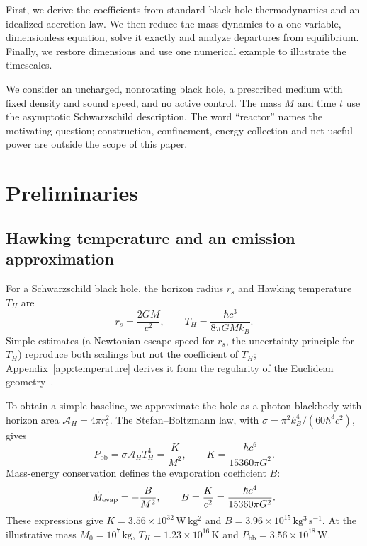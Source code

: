 \documentclass[11pt,a4paper]{article}
\newcommand{\Pbb}{P_{\mathrm{bb}}}
\begin{document}
First, we derive the coefficients from standard black hole thermodynamics and an idealized accretion law. We then reduce the mass dynamics to a one-variable, dimensionless equation, solve it exactly and analyze departures from equilibrium. Finally, we restore dimensions and use one numerical example to illustrate the timescales.

We consider an uncharged, nonrotating black hole, a prescribed medium with fixed density and sound speed, and no active control. The mass $M$ and time $t$ use the asymptotic Schwarzschild description. The word ``reactor'' names the motivating question; construction, confinement, energy collection and net useful power are outside the scope of this paper.

\section{Preliminaries}
\subsection{Hawking temperature and an emission approximation}
For a Schwarzschild black hole, the horizon radius $r_s$ and Hawking temperature $T_H$ are
\begin{equation}
 r_s=\frac{2GM}{c^2},\qquad T_H=\frac{\hbar c^3}{8\pi GMk_B}.
 \label{eq:temperature}
\end{equation}
Simple estimates (a Newtonian escape speed for $r_s$, the uncertainty principle for $T_H$) reproduce both scalings but not the coefficient of $T_H$; Appendix~\ref{app:temperature} derives it from the regularity of the Euclidean geometry~\cite{gibbons,genolini}.

To obtain a simple baseline, we approximate the hole as a photon blackbody with horizon area $\mathcal A_H=4\pi r_s^2$. The Stefan--Boltzmann law, with $\sigma=\pi^2 k_B^4/(60\hbar^3c^2)$, gives
\begin{equation}
 \Pbb=\sigma\mathcal A_H T_H^4=\frac{K}{M^2},\qquad
 K=\frac{\hbar c^6}{15360\pi G^2}.
 \label{eq:power}
\end{equation}
Mass-energy conservation defines the evaporation coefficient $B$:
\begin{equation*}
 \dot M_{\rm evap}=-\frac{B}{M^2},\qquad B=\frac{K}{c^2}
 =\frac{\hbar c^4}{15360\pi G^2}.
\end{equation*}
These expressions give $K=3.56\times10^{32}\,\mathrm{W\,kg^2}$ and $B=3.96\times10^{15}\,\mathrm{kg^3\,s^{-1}}$. At the illustrative mass $M_0=10^7\,\mathrm{kg}$, $T_H=1.23\times10^{16}\,\mathrm{K}$ and $\Pbb=3.56\times10^{18}\,\mathrm{W}$.
\end{document}
